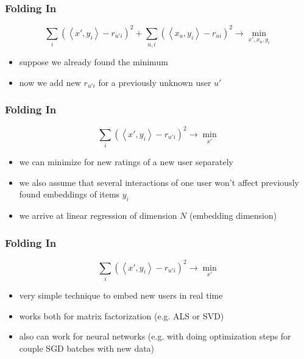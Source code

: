 \documentclass[t]{beamer}
\begin{document}
\begin{frame}
  \frametitle{Folding In}
  $$\sum\limits_i\left(\left<x',y_i\right>-r_{u'i}\right)^2+\sum\limits_{u,i}\left(\left<x_u,y_i\right>-r_{ui}\right)^2\longrightarrow\min_{x',x_u,y_i}$$
  \begin{itemize}
  \item suppose we already found the minimum
  \item now we add new $r_{u'i}$ for a previously unknown user $u'$
  \end{itemize}  
\end{frame}
\begin{frame}
  \frametitle{Folding In}
  $$\sum\limits_i\left(\left<x',y_i\right>-r_{u'i}\right)^2\longrightarrow\min_{x'}$$
  \begin{itemize}
  \item we can minimize for new ratings of a new user separately
  \item we also assume that several interactions of one user won't affect previously found embeddings of items $y_i$
  \item we arrive at linear regression of dimension $N$ (embedding dimension)
  \end{itemize}  
\end{frame}
\begin{frame}
  \frametitle{Folding In}
  $$\sum\limits_i\left(\left<x',y_i\right>-r_{u'i}\right)^2\longrightarrow\min_{x'}$$
  \begin{itemize}
  \item very simple technique to embed new users in real time
  \item works both for matrix factorization (e.g. ALS or SVD)
  \item also can work for neural networks (e.g. with doing optimization steps for couple SGD batches with new data)
  \end{itemize}
\end{frame}
\end{document}
